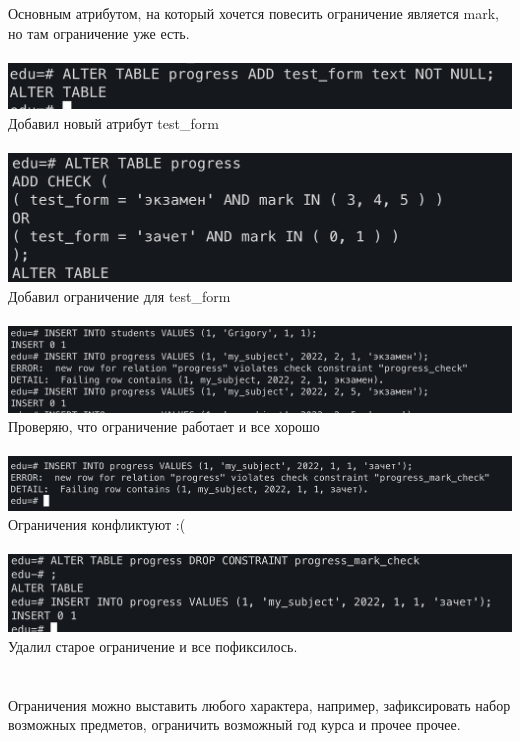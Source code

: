 \documentclass[a4paper,12pt]{article}
\begin{document}
Основным атрибутом, на который хочется повесить ограничение является mark, но там ограничение уже есть.
\\\\
\includegraphics[scale=0.5]{22.png}
\\
Добавил новый атрибут test\_form
\\\\
\includegraphics[scale=0.5]{23.png}
\\
Добавил ограничение для test\_form
\\\\
\includegraphics[scale=0.5]{24.png}
\\
Проверяю, что ограничение работает и все хорошо
\\\\
\includegraphics[scale=0.5]{25.png}
\\
Ограничения конфликтуют :(
\\\\
\includegraphics[scale=0.5]{26.png}
\\
Удалил старое ограничение и все пофиксилось.
\\\\\\
Ограничения можно выставить любого характера, например, зафиксировать набор возможных предметов, ограничить возможный год курса и прочее прочее.
\clearpage
\end{document}
